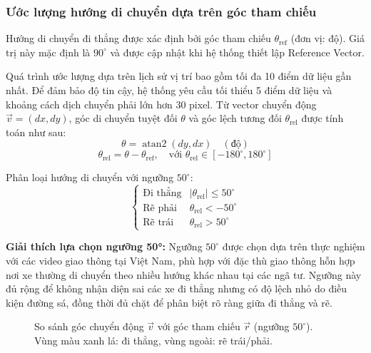 \subsubsection{Ước lượng hướng di chuyển dựa trên góc tham chiếu}
Hướng di chuyển đi thẳng được xác định bởi góc tham chiếu $\theta_{\text{ref}}$ (đơn vị: độ). Giá trị này mặc định là $90^\circ$ và được cập nhật khi hệ thống thiết lập Reference Vector.

Quá trình ước lượng dựa trên lịch sử vị trí bao gồm tối đa 10 điểm dữ liệu gần nhất. Để đảm bảo độ tin cậy, hệ thống yêu cầu tối thiểu 5 điểm dữ liệu và khoảng cách dịch chuyển phải lớn hơn 30 pixel. Từ vector chuyển động $\vec{v}=(dx, dy)$, góc di chuyển tuyệt đối $\theta$ và góc lệch tương đối $\theta_{\text{rel}}$ được tính toán như sau:
\[
    \theta = \operatorname{atan2}(dy, dx) \quad (\text{độ})
\]
\[
    \theta_{\text{rel}} = \theta - \theta_{\text{ref}}, \quad \text{với } \theta_{\text{rel}} \in [-180^\circ, 180^\circ]
\]

Phân loại hướng di chuyển với ngưỡng \(50^\circ\):
\[
\begin{cases}
\text{Đi thẳng} & |\theta_{\text{rel}}| \le 50^\circ \\
\text{Rẽ phải} & \theta_{\text{rel}} < -50^\circ \\
\text{Rẽ trái} & \theta_{\text{rel}} > 50^\circ
\end{cases}
\]

\textbf{Giải thích lựa chọn ngưỡng 50°:} Ngưỡng $50^\circ$ được chọn dựa trên thực nghiệm với các video giao thông tại Việt Nam, phù hợp với đặc thù giao thông hỗn hợp nơi xe thường di chuyển theo nhiều hướng khác nhau tại các ngã tư. Ngưỡng này đủ rộng để không nhận diện sai các xe đi thẳng nhưng có độ lệch nhỏ do điều kiện đường sá, đồng thời đủ chặt để phân biệt rõ ràng giữa đi thẳng và rẽ.

\begin{figure}[!htbp]
  \centering
  \caption{So sánh góc chuyển động $\vec v$ với góc tham chiếu $\vec r$ (ngưỡng $50^\circ$). Vùng màu xanh lá: đi thẳng, vùng ngoài: rẽ trái/phải.}
  \label{fig:direction_reference}
\end{figure}


